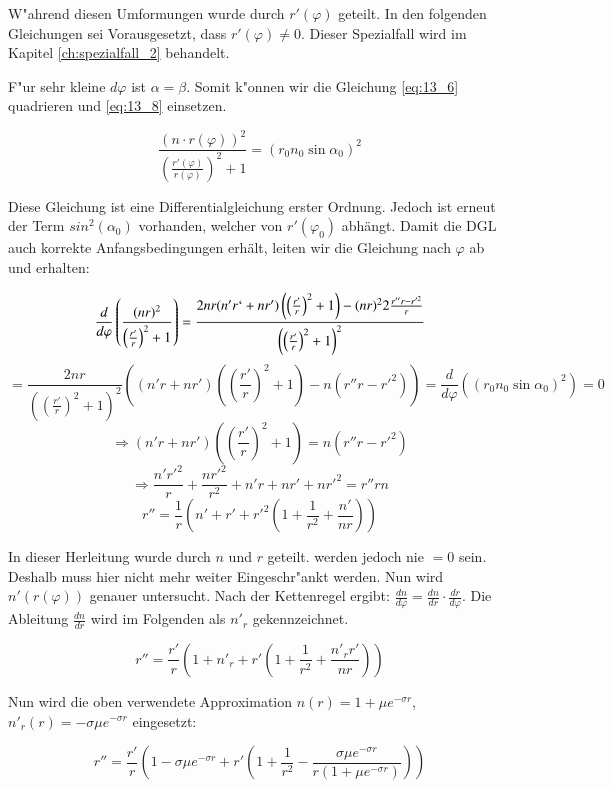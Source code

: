 W"ahrend diesen Umformungen wurde durch $r'(\varphi)$ geteilt. In den folgenden
Gleichungen sei Vorausgesetzt, dass $r'(\varphi) \neq 0$. Dieser Spezialfall wird im
Kapitel \ref{ch:spezialfall_2} behandelt. 

F"ur sehr kleine $d\varphi$ ist $\alpha = \beta$. Somit k"onnen wir die Gleichung
\ref{eq:13_6} quadrieren und \ref{eq:13_8} einsetzen.

$$\frac{(n \cdot r(\varphi))^2}{\left( \frac{r'(\varphi)}{r(\varphi)} \right)^2 +1} =
(r_0 n_0 \sin \alpha_0)^2$$

Diese Gleichung ist eine Differentialgleichung erster Ordnung. Jedoch ist erneut der Term
$sin^2(\alpha_0)$ vorhanden, welcher von $r'(\varphi_0)$ abhängt. Damit die DGL auch
korrekte Anfangsbedingungen erhält, leiten wir die Gleichung nach $\varphi$ ab und
erhalten:

$$\frac{d}{d\varphi}\left(\frac{(n r)^2}{\left(\frac{r'}{r}\right)^2 + 1}\right) = 
\frac{2nr (n'r `+ nr') \left( \left( \frac{r'}{r} \right)^2 +1\right) - (nr)^2 2
\frac{r'' r - r'^2}{r}}{\left( \left( \frac{r'}{r} \right)^2 + 1 \right)^2}$$
$$ = \frac{2nr}{\left( \left( \frac{r'}{r} \right)^2 + 1 \right)^2} \left( (n'r + nr')
\left( \left( \frac{r'}{r} \right)^2 + 1 \right) - n \left( r'' r - r'^2 \right) \right)
= \frac{d}{d\varphi} \left(\left( r_0 n_0 \sin \alpha_0\right)^2 \right) = 0$$
$$\Rightarrow (n'r + nr') \left( \left( \frac{r'}{r} \right)^2 + 1 \right) = n \left( r''
r - r'^2 \right)$$
$$\Rightarrow \frac{n'r'^2}{r} + \frac{n r'^2}{r^2} + n'r + nr' + nr'^2 = r'' r n$$
\begin{equation}
r'' = \frac{1}{r} \left( n' + r' + r'^2 \left( 1 + \frac{1}{r^2} + \frac{n'}{n r} \right)
\right)
\end{equation}

In dieser Herleitung wurde durch $n$ und $r$ geteilt. werden jedoch nie $= 0$ sein.
Deshalb muss hier nicht mehr weiter Eingeschr"ankt werden. Nun wird $n'(r(\varphi))$
genauer untersucht. Nach der Kettenregel ergibt: $\frac{dn}{d\varphi} = \frac{dn}{dr}
\cdot \frac{dr}{d\varphi}$. Die Ableitung $\frac{dn}{dr}$ wird im Folgenden als $n'_r$
gekennzeichnet.

$$r'' = \frac{r'}{r} \left( 1 + n'_r + r' \left( 1 + \frac{1}{r^2} + \frac{n'_r r'}{n r}
\right) \right)$$

Nun wird die oben verwendete Approximation $n(r) = 1 + \mu e^{-\sigma r}$, $n'_r(r) =
-\sigma \mu e^{-\sigma r}$ eingesetzt:

\begin{equation} \label{eq:sphere_dgl_approx}
r'' = \frac{r'}{r} \left(1 - \sigma \mu e^{-\sigma r} + r' \left( 1 + \frac{1}{r^2} -
\frac{\sigma \mu e^{-\sigma r}}{r (1 + \mu e^{-\sigma r})} \right) \right)
\end{equation}



